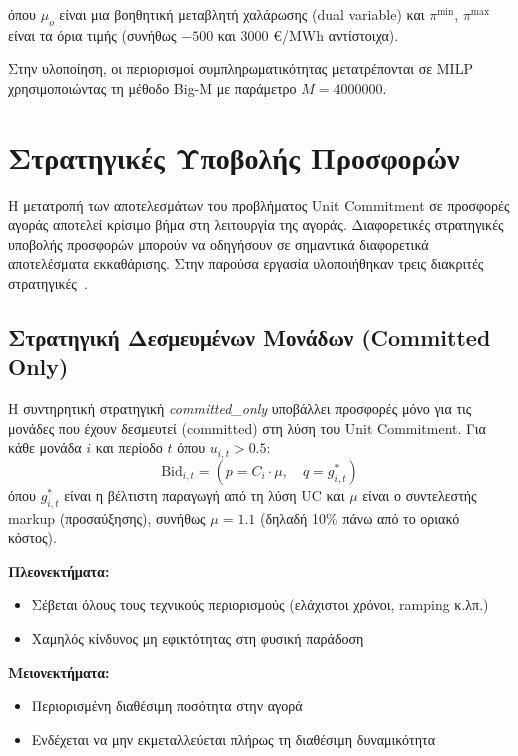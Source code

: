 όπου $\mu_o$ είναι μια βοηθητική μεταβλητή χαλάρωσης (dual variable) και $\pi^{\min}$, $\pi^{\max}$ είναι τα όρια τιμής (συνήθως $-500$ και $3000$ €/MWh αντίστοιχα).

Στην υλοποίηση, οι περιορισμοί συμπληρωματικότητας μετατρέπονται σε MILP χρησιμοποιώντας τη μέθοδο Big-M με παράμετρο $M = 4000000$.


\section{Στρατηγικές Υποβολής Προσφορών}
\label{sec:bidding-strategies}

Η μετατροπή των αποτελεσμάτων του προβλήματος Unit Commitment σε προσφορές αγοράς αποτελεί κρίσιμο βήμα στη λειτουργία της αγοράς. Διαφορετικές στρατηγικές υποβολής προσφορών μπορούν να οδηγήσουν σε σημαντικά διαφορετικά αποτελέσματα εκκαθάρισης. Στην παρούσα εργασία υλοποιήθηκαν τρεις διακριτές στρατηγικές~\cite{ventosa2005, conejo2010}.

\subsection{Στρατηγική Δεσμευμένων Μονάδων (Committed Only)}
\label{subsec:strategy-committed-only}

Η συντηρητική στρατηγική \textit{committed\_only} υποβάλλει προσφορές μόνο για τις μονάδες που έχουν δεσμευτεί (committed) στη λύση του Unit Commitment. Για κάθε μονάδα $i$ και περίοδο $t$ όπου $u_{i,t} > 0.5$:
\begin{equation}
\label{eq:committed-only-bid}
\text{Bid}_{i,t} = \left( p = C_i \cdot \mu, \quad q = g_{i,t}^* \right)
\end{equation}
όπου $g_{i,t}^*$ είναι η βέλτιστη παραγωγή από τη λύση UC και $\mu$ είναι ο συντελεστής markup (προσαύξησης), συνήθως $\mu = 1.1$ (δηλαδή 10\% πάνω από το οριακό κόστος).

\textbf{Πλεονεκτήματα:}
\begin{itemize}
    \item Σέβεται όλους τους τεχνικούς περιορισμούς (ελάχιστοι χρόνοι, ramping κ.λπ.)
    \item Χαμηλός κίνδυνος μη εφικτότητας στη φυσική παράδοση
\end{itemize}

\textbf{Μειονεκτήματα:}
\begin{itemize}
    \item Περιορισμένη διαθέσιμη ποσότητα στην αγορά
    \item Ενδέχεται να μην εκμεταλλεύεται πλήρως τη διαθέσιμη δυναμικότητα
\end{itemize}

